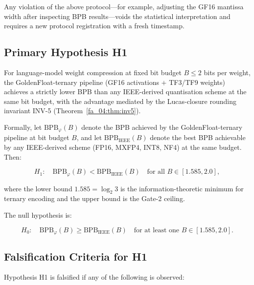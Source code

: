 Any violation of the above protocol---for example, adjusting the GF16
mantissa width after inspecting BPB results---voids the statistical
interpretation and requires a new protocol registration with a fresh
timestamp.

\subsection{Primary Hypothesis H1}\label{fa_05:sec:h1}

\begin{hypothesis}
\label{fa_05:hyp:H1}
For language-model weight compression at fixed bit budget \(B \le 2\)
bits per weight, the GoldenFloat-ternary pipeline
(GF16 activations \(+\) TF3/TF9 weights) achieves a strictly lower BPB
than any IEEE-derived quantisation scheme at the same bit budget, with
the advantage mediated by the Lucas-closure rounding invariant INV-5
(Theorem~\ref{fa_04:thm:inv5}).
\end{hypothesis}

Formally, let \(\mathrm{BPB}_{\varphi}(B)\) denote the BPB achieved by the
GoldenFloat-ternary pipeline at bit budget \(B\), and let
\(\mathrm{BPB}_{\mathrm{IEEE}}(B)\) denote the best BPB achievable by any
IEEE-derived scheme (FP16, MXFP4, INT8, NF4) at the same budget. Then:

\begin{equation}
  H_1:\quad \mathrm{BPB}_{\varphi}(B) < \mathrm{BPB}_{\mathrm{IEEE}}(B)
  \quad \text{for all } B \in [1.585, 2.0],
  \label{fa_05:eq:H1}
\end{equation}

where the lower bound \(1.585 = \log_2 3\) is the information-theoretic
minimum for ternary encoding and the upper bound is the Gate-2 ceiling.

The null hypothesis is:

\begin{equation}
  H_0:\quad \mathrm{BPB}_{\varphi}(B) \ge \mathrm{BPB}_{\mathrm{IEEE}}(B)
  \quad \text{for at least one } B \in [1.585, 2.0].
  \label{fa_05:eq:H0}
\end{equation}

\subsection{Falsification Criteria for H1}\label{fa_05:sec:H1-falsification}

Hypothesis H1 is falsified if any of the following is observed:


